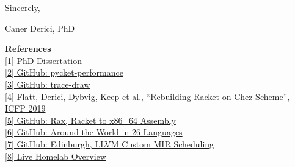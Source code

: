 \vspace{1.2em}

Sincerely,

Caner Derici, PhD

\vfill

{\small
	\noindent\textbf{References} \\[0.25em]
	\noindent \href{\dissertationurl}{[1] PhD Dissertation} \\
	\noindent \href{\pycketperfurl}{[2] GitHub: pycket-performance} \\
	\noindent \href{\tracedrawurl}{[3] GitHub: trace-draw} \\
	\noindent \href{\icfpreporturl}{[4] Flatt, Derici, Dybvig, Keep et al., ``Rebuilding Racket on Chez Scheme'', ICFP 2019} \\
	\noindent \href{\raxurl}{[5] GitHub: Rax, Racket to x86\_64 Assembly} \\
    \noindent \href{\atwurl}{[6] GitHub: Around the World in 26 Languages} \\
\noindent \href{\edinburghurl}{[7] GitHub: Edinburgh, LLVM Custom MIR Scheduling} \\
\noindent \href{\homelaburl}{[8] Live Homelab Overview}
}



